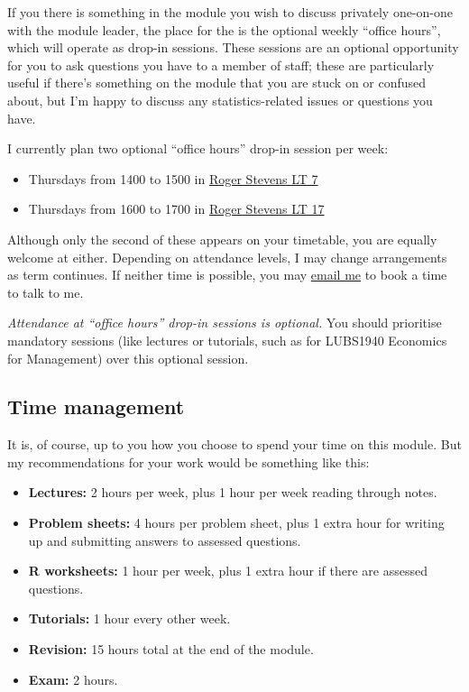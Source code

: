 \documentclass[
  a4paper,
]{book}
\providecommand{\tightlist}{%
  \setlength{\itemsep}{0pt}\setlength{\parskip}{0pt}}
\theoremstyle{definition}
\theoremstyle{definition}
\theoremstyle{definition}
\theoremstyle{definition}
\theoremstyle{remark}
\begin{document}
If you there is something in the module you wish to discuss privately one-on-one with the module leader, the place for the is the optional weekly ``office hours'', which will operate as drop-in sessions. These sessions are an optional opportunity for you to ask questions you have to a member of staff; these are particularly useful if there's something on the module that you are stuck on or confused about, but I'm happy to discuss any statistics-related issues or questions you have.

I currently plan two optional ``office hours'' drop-in session per week:

\begin{itemize}
\tightlist
\item
  Thursdays from 1400 to 1500 in \href{https://students.leeds.ac.uk/rooms?type=room\&id=100031}{Roger Stevens LT 7}
\item
  Thursdays from 1600 to 1700 in \href{https://students.leeds.ac.uk/rooms?type=room\&id=100041}{Roger Stevens LT 17}
\end{itemize}

Although only the second of these appears on your timetable, you are equally welcome at either. Depending on attendance levels, I may change arrangements as term continues. If neither time is possible, you may \href{mailto:m.aldridge@leeds.ac.uk}{email me} to book a time to talk to me.

\emph{Attendance at ``office hours'' drop-in sessions is optional.} You should prioritise mandatory sessions (like lectures or tutorials, such as for LUBS1940 Economics for Management) over this optional session.

\hypertarget{time}{%
\subsection*{Time management}\label{time}}

It is, of course, up to you how you choose to spend your time on this module. But my recommendations for your work would be something like this:

\begin{itemize}
\tightlist
\item
  \textbf{Lectures:} 2 hours per week, plus 1 hour per week reading through notes.
\item
  \textbf{Problem sheets:} 4 hours per problem sheet, plus 1 extra hour for writing up and submitting answers to assessed questions.
\item
  \textbf{R worksheets:} 1 hour per week, plus 1 extra hour if there are assessed questions.
\item
  \textbf{Tutorials:} 1 hour every other week.
\item
  \textbf{Revision:} 15 hours total at the end of the module.
\item
  \textbf{Exam:} 2 hours.
\end{itemize}
\end{document}
